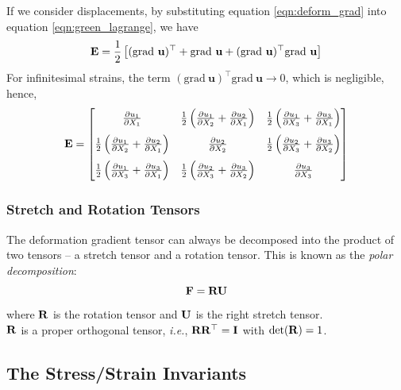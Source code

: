 \documentclass[12pt, a4paper]{article}
\numberwithin{equation}{section}
\begin{document}
If we consider displacements, by substituting equation \ref{eqn:deform_grad} into equation \ref{eqn:green_lagrange}, we have
\[
    \bE = \frac{1}{2} \left[ (\textrm{grad} \ \mathbf{u})^\top + \textrm{grad} \ \mathbf{u} + (\textrm{grad} \ \mathbf{u})^\top \textrm{grad} \ \mathbf{u} \right]
\]
For infinitesimal strains, the term $(\textrm{grad} \ \mathbf{u})^\top \textrm{grad} \ \mathbf{u} \to 0$, which is negligible, hence,
\[
    \mathbf{E} = 
    \begin{bmatrix}
        \frac{\partial u_1}{\partial X_1} & \frac{1}{2} \left( \frac{\partial u_1}{\partial X_2} + \frac{\partial u_2}{\partial X_1} \right) & \frac{1}{2} \left( \frac{\partial u_1}{\partial X_3} + \frac{\partial u_3}{\partial X_1} \right) \\[2ex]
        
        \frac{1}{2} \left( \frac{\partial u_1}{\partial X_2} + \frac{\partial u_2}{\partial X_1} \right) & \frac{\partial u_2}{\partial X_2} & \frac{1}{2} \left( \frac{\partial u_2}{\partial X_3} + \frac{\partial u_3}{\partial X_2} \right) \\[2ex]
        
        \frac{1}{2} \left( \frac{\partial u_1}{\partial X_3} + \frac{\partial u_3}{\partial X_1} \right) & \frac{1}{2} \left( \frac{\partial u_2}{\partial X_3} + \frac{\partial u_3}{\partial X_2} \right) & \frac{\partial u_3}{\partial X_3} \\
    \end{bmatrix}
\]

\subsubsection{Stretch and Rotation Tensors}
The deformation gradient tensor can always be decomposed into the product of two tensors -- a stretch tensor and a rotation tensor. This is known as the \textit{polar decomposition}:
\begin{equation}
    \mathbf{F}  = {\bf R} {\bf U}
\end{equation}
where $\bf R$ is the rotation tensor and $\bf U$ is the right stretch tensor. \\ 


$\mathbf{R}$ is a proper orthogonal tensor, \textit{i.e.}, ${\bf R}{\bf R}^\top = {\bf I}$ with $\det({\bf R}) = 1$.


\newpage
\subsection{The Stress/Strain Invariants}
\end{document}
